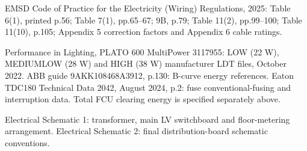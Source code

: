 EMSD Code of Practice for the Electricity (Wiring) Regulations, 2025: Table 6(1), printed p.56; Table 7(1), pp.65--67; 9B, p.79; Table 11(2), pp.99--100; Table 11(10), p.105; Appendix 5 correction factors and Appendix 6 cable ratings.

Performance in Lighting, PLATO 600 MultiPower 3117955: LOW (22 W), MEDIUMLOW (28 W) and HIGH (38 W) manufacturer LDT files, October 2022. ABB guide 9AKK108468A3912, p.130: B-curve energy references. Eaton TDC180 Technical Data 2042, August 2024, p.2: fuse conventional-fusing and interruption data. Total FCU clearing energy is specified separately above.

\noindent Electrical Schematic 1: transformer, main LV switchboard and floor-metering arrangement. Electrical Schematic 2: final distribution-board schematic conventions.
